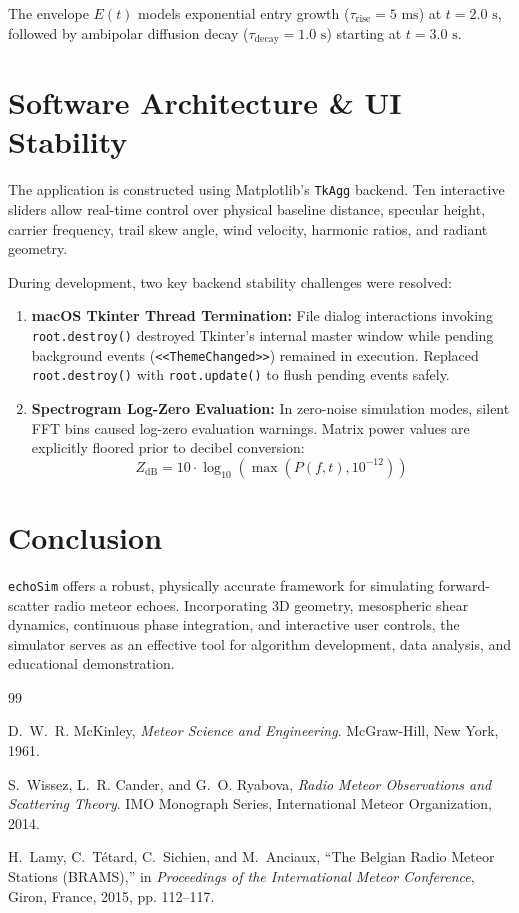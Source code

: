 \documentclass[10pt,twocolumn,a4paper]{article}
\begin{document}
The envelope $E(t)$ models exponential entry growth ($\tau_{\mathrm{rise}} = 5\text{ ms}$) at $t = 2.0\text{ s}$, followed by ambipolar diffusion decay ($\tau_{\mathrm{decay}} = 1.0\text{ s}$) starting at $t = 3.0\text{ s}$.

\section{Software Architecture \& UI Stability}
The application is constructed using Matplotlib's \texttt{TkAgg} backend. Ten interactive sliders allow real-time control over physical baseline distance, specular height, carrier frequency, trail skew angle, wind velocity, harmonic ratios, and radiant geometry.

During development, two key backend stability challenges were resolved:
\begin{enumerate}
    \item \textbf{macOS Tkinter Thread Termination:} File dialog interactions invoking \texttt{root.destroy()} destroyed Tkinter's internal master window while pending background events (\texttt{<<ThemeChanged>>}) remained in execution. Replaced \texttt{root.destroy()} with \texttt{root.update()} to flush pending events safely.
    \item \textbf{Spectrogram Log-Zero Evaluation:} In zero-noise simulation modes, silent FFT bins caused log-zero evaluation warnings. Matrix power values are explicitly floored prior to decibel conversion:
    \begin{equation}
    Z_{\mathrm{dB}} = 10 \cdot \log_{10}\left(\max(P(f, t), 10^{-12})\right)
    \end{equation}
\end{enumerate}

\section{Conclusion}
\texttt{echoSim} offers a robust, physically accurate framework for simulating forward-scatter radio meteor echoes. Incorporating 3D geometry, mesospheric shear dynamics, continuous phase integration, and interactive user controls, the simulator serves as an effective tool for algorithm development, data analysis, and educational demonstration.

\begin{thebibliography}{99}

D.~W.~R. McKinley, \emph{Meteor Science and Engineering}. McGraw-Hill, New York, 1961.

S.~Wissez, L.~R. Cander, and G.~O. Ryabova, \emph{Radio Meteor Observations and Scattering Theory}. IMO Monograph Series, International Meteor Organization, 2014.

H.~Lamy, C.~Tétard, C.~Sichien, and M.~Anciaux, ``The Belgian Radio Meteor Stations (BRAMS),'' in \emph{Proceedings of the International Meteor Conference}, Giron, France, 2015, pp. 112--117.

\end{thebibliography}
\end{document}
